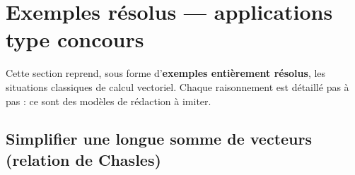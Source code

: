 \documentclass[11pt,a4paper]{article}
\begin{document}
\section{Exemples résolus — applications type concours}
Cette section reprend, sous forme d'\textbf{exemples entièrement résolus}, les situations classiques de
calcul vectoriel. Chaque raisonnement est détaillé pas à pas : ce sont des modèles de rédaction à
imiter.

\subsection{Simplifier une longue somme de vecteurs (relation de Chasles)}
\end{document}
